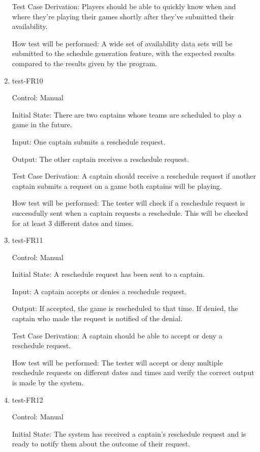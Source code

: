 \documentclass[12pt, titlepage]{article}
\begin{document}
\begin{enumerate}
  Test Case Derivation: Players should be able to quickly know when and where
  they're playing their games shortly after they've submitted their availability.

  How test will be performed: A wide set of availability data sets will be
  submitted to the schedule generation feature, with the expected results
  compared to the results given by the program.

  \item{test-FR10\\}

  Control: Manual

  Initial State: There are two captains whose teams are scheduled to play a
  game in the future.

  Input: One captain submits a reschedule request.

  Output: The other captain receives a reschedule request.

  Test Case Derivation: A captain should receive a reschedule request if another
  captain submits a request on a game both captains will be playing.

  How test will be performed: The tester will check if a reschedule request is
  successfully sent when a captain requests a reschedule. This will be checked
  for at least 3 different dates and times.

  \item{test-FR11\\}

  Control: Manual

  Initial State: A reschedule request has been sent to a captain.

  Input: A captain accepts or denies a reschedule request.

  Output: If accepted, the game is rescheduled to that time. If denied, the
  captain who made the request is notified of the denial.

  Test Case Derivation: A captain should be able to accept or deny a reschedule
  request.

  How test will be performed: The tester will accept or deny multiple reschedule
  requests on different dates and times and verify the correct output is made by
  the system.

  \item{test-FR12\\}

  Control: Manual

  Initial State: The system has received a captain's reschedule request and is ready to
  notify them about the outcome of their request.


\end{enumerate}
\end{document}
